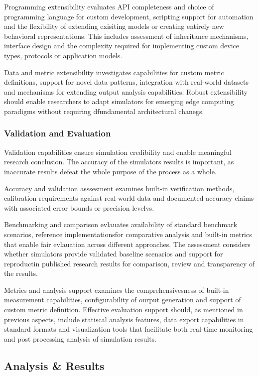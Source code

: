 Programming extensibility evaluates API completeness and choice of programming language for custom development, scripting support for automation and the flexibility of extending exisiting models or creating entirely new behavioral representations.
This includes assessment of inheritance mechanisms, interface design and the complexity required for implementing custom device types, protocols or application models.

Data and metric extensibility investigates capabilities for custom metric definitions, support for novel data patterns, integration with real-world datasets and mechanisms for extending output analysis capabilities.
Robust extensibility should enable researchers to adapt simulators for emerging edge computing paradigms without requiring dfundamental architectural chanegs.

\subsubsection{Validation and Evaluation}
Validation capabilities ensure simulation credibility and enable meaningful research conclusion.
The accuracy of the simulators results is important, as inaccurate results defeat the whole purpose of the process as a whole.

Accuracy and validation asssesment examines built-in verification methods, calibration requirements against real-world data and documented accuracy claims with associated error bounds or precision levelvs.

Benchmarking and comparison evlauates availability of standard benchmark scenarios, reference implementationsfor comparative analysis and built-in metrics that enable fair evlauation across different approaches.
The assessment considers whether simulators provide validated baseline scenarios and support for reproductin published research results for comparison, review and transparency of the results.

Metrics and analysis support examines the comprehensivesness of built-in measurement capabilities, configurability of ourput generation and support of custom metric definition.
Effective evaluation support should, as mentioned in previous aspects, include statiscal analysis features, data export capabilities in standard formats and visualization tools that facilitate both real-time monitoring and post processing analysis of simulation results. 

\subsection{Analysis \& Results}


